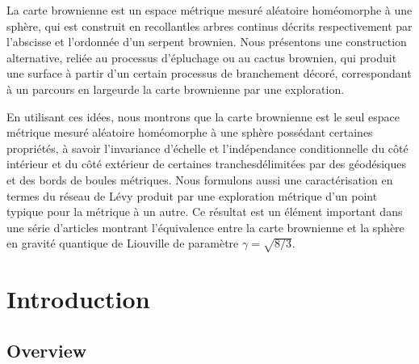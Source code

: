 \documentclass[JEP,XML,SOM,Unicode]{cedram}
\theoremstyle{plain}
\numberwithin{theorem}{section}
\theoremstyle{definition}
\begin{document}



\begin{altabstract}
La carte brownienne est un espace métrique mesuré aléatoire homéomorphe à une sphère, qui est construit en \og recollant\fg les arbres continus décrits respectivement par l'abscisse et l'ordonnée d'un serpent brownien. Nous présentons une construction alternative, reliée au processus d'épluchage ou au cactus brownien, qui produit une surface à partir d'un certain processus de branchement décoré, correspondant à un parcours \og en largeur\fg de la carte brownienne par une exploration.
\par
En utilisant ces idées, nous montrons que la carte brownienne est le seul espace métrique mesuré aléatoire homéomorphe à une sphère possédant certaines propriétés, à savoir l'invariance d'échelle et l'indépendance conditionnelle du côté intérieur et du côté extérieur de certaines \og tranches\fg délimitées par des géodésiques et des bords de boules métriques. Nous formulons aussi une caractérisation en termes du réseau de Lévy produit par une exploration métrique d'un point typique pour la métrique à un autre. Ce résultat est un élément important dans une série d'articles montrant l'équivalence entre la carte brownienne et la sphère en gravité quantique de Liouville de paramètre $\gamma= \sqrt{8/3}$.
\end{altabstract}

\maketitle

\setcounter{tocdepth}{2}
\tableofcontents


\section{Introduction}
\label{sec::introduction}

\subsection{Overview}
\end{document}
